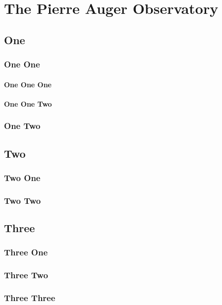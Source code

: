 
\chapter{The Pierre Auger Observatory}
\label{chap:pierre-auger-observatory}
\blindtext
\section{One}
\blindtext
\subsection{One One}
\blindtext
\subsubsection{One One One}
\blindtext
\subsubsection{One One Two}
\blindtext
\subsection{One Two}
\blindtext
\section{Two}
\blindtext
\subsection{Two One}
\blindtext
\subsection{Two Two}
\blindtext
\section{Three}
\blindtext
\subsection{Three One}
\blindtext
\subsection{Three Two}
\blindtext
\subsection{Three Three}
\blindtext